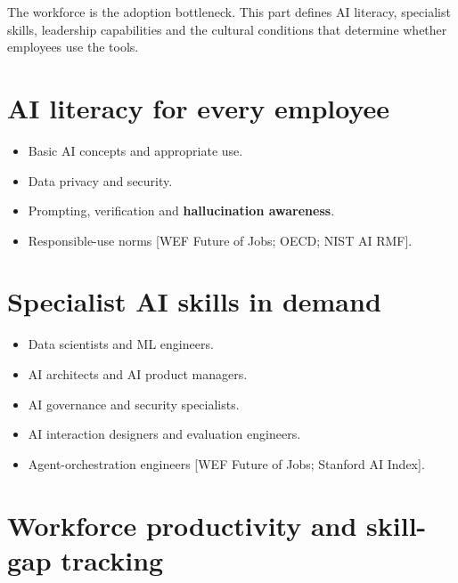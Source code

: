 
The workforce is the adoption bottleneck. This part defines AI literacy,
specialist skills, leadership capabilities and the cultural conditions that
determine whether employees use the tools.

\section{AI literacy for every employee}

\begin{itemize}
  \item Basic AI concepts and appropriate use.
  \item Data privacy and security.
  \item Prompting, verification and \textbf{hallucination awareness}.
  \item Responsible-use norms [WEF Future of Jobs; OECD; NIST AI RMF].
\end{itemize}

\section{Specialist AI skills in demand}

\begin{itemize}
  \item Data scientists and ML engineers.
  \item AI architects and AI product managers.
  \item AI governance and security specialists.
  \item AI interaction designers and evaluation engineers.
  \item Agent-orchestration engineers [WEF Future of Jobs; Stanford AI Index].
\end{itemize}

\section{Workforce productivity and skill-gap tracking}

